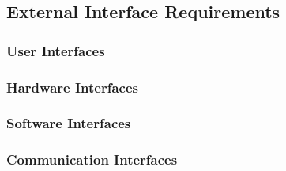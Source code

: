 \documentclass{article}
\begin{document}
\subsection{External Interface Requirements}
\subsubsection{User Interfaces}
\subsubsection{Hardware Interfaces}
\subsubsection{Software Interfaces}
\subsubsection{Communication Interfaces}
\end{document}
